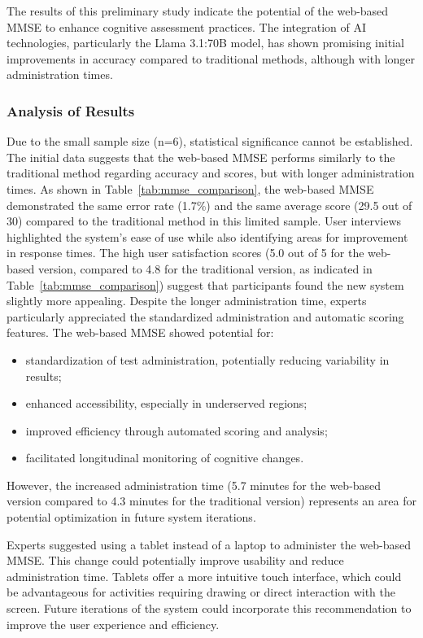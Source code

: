 The results of this preliminary study indicate the potential of the web-based MMSE to enhance cognitive assessment practices. The integration of AI technologies, particularly the Llama 3.1:70B model, has shown promising initial improvements in accuracy compared to traditional methods, although with longer administration times.

\subsubsection{Analysis of Results}
Due to the small sample size (n=6), statistical significance cannot be established. The initial data suggests that the web-based MMSE performs similarly to the traditional method regarding accuracy and scores, but with longer administration times. As shown in Table~\ref{tab:mmse_comparison}, the web-based MMSE demonstrated the same error rate (1.7\%) and the same average score (29.5 out of 30) compared to the traditional method in this limited sample.
User interviews highlighted the system's ease of use while also identifying areas for improvement in response times. The high user satisfaction scores (5.0 out of 5 for the web-based version, compared to 4.8 for the traditional version, as indicated in Table~\ref{tab:mmse_comparison}) suggest that participants found the new system slightly more appealing. Despite the longer administration time, experts particularly appreciated the standardized administration and automatic scoring features.
The web-based MMSE showed potential for:
\begin{itemize}
\item standardization of test administration, potentially reducing variability in results;
\item enhanced accessibility, especially in underserved regions;
\item improved efficiency through automated scoring and analysis;
\item facilitated longitudinal monitoring of cognitive changes.
\end{itemize}
However, the increased administration time (5.7 minutes for the web-based version compared to 4.3 minutes for the traditional version) represents an area for potential optimization in future system iterations.

Experts suggested using a tablet instead of a laptop to administer the web-based MMSE. This change could potentially improve usability and reduce administration time. Tablets offer a more intuitive touch interface, which could be advantageous for activities requiring drawing or direct interaction with the screen. Future iterations of the system could incorporate this recommendation to improve the user experience and efficiency.

